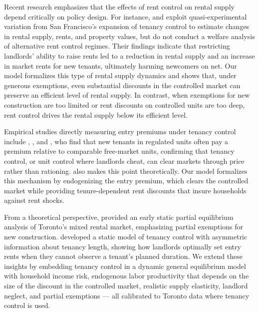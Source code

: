 \documentclass[parskip=full]{article}
\begin{document}
Recent research emphasizes that the effects of rent control on rental supply depend critically on policy design. For instance, \citet{diamond-2019} and \citet{dmq-2019} exploit quasi-experimental variation from San Francisco’s expansion of tenancy control to estimate changes in rental supply, rents, and property values, but do not conduct a welfare analysis of alternative rent control regimes. Their findings indicate that restricting landlords’ ability to raise rents led to a reduction in rental supply and an increase in market rents for new tenants, ultimately harming newcomers on net. Our model formalizes this type of rental supply dynamics and shows that, under generous exemptions, even substantial discounts in the controlled market can preserve an efficient level of rental supply. In contrast, when exemptions for new construction are too limited or rent discounts on controlled units are too deep, rent control drives the rental supply below its efficient level.

Empirical studies directly measuring entry premiums under tenancy control include \citet{nagy-1997}, \citet{early-2000}, and \citet{cjq-2023}, who find that new tenants in regulated units often pay a premium relative to comparable free-market units, confirming that tenancy control, or unit control where landlords cheat, can clear markets through price rather than rationing. \citet{arnott-1995} also makes this point theoretically. Our model formalizes this mechanism by endogenizing the entry premium, which clears the controlled market while providing tenure-dependent rent discounts that insure households against rent shocks.

From a theoretical perspective, \citet{fallis-1985} provided an early static partial equilibrium analysis of Toronto’s mixed rental market, emphasizing partial exemptions for new construction. \citet{be-2000} developed a static model of tenancy control with asymmetric information about tenancy length, showing how landlords optimally set entry rents when they cannot observe a tenant’s planned duration. We extend these insights by embedding tenancy control in a dynamic general equilibrium model with household income risk, endogenous labor productivity that depends on the size of the discount in the controlled market, realistic supply elasticity, landlord neglect, and partial exemptions — all calibrated to Toronto data where tenancy control is used.
\end{document}
